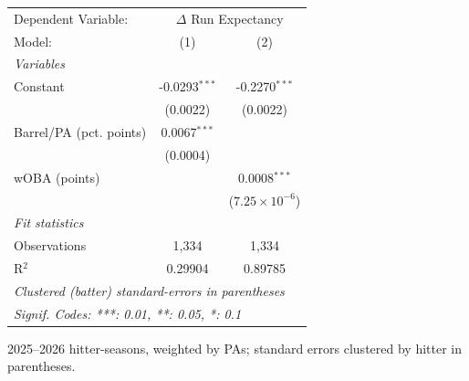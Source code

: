 
\begingroup
\centering
\begin{tabular}{lcc}
   \tabularnewline \midrule \midrule
   Dependent Variable: & \multicolumn{2}{c}{$\Delta$ Run Expectancy}\\
   Model:                  & (1)             & (2)\\  
   \midrule
   \emph{Variables}\\
   Constant                & -0.0293$^{***}$ & -0.2270$^{***}$\\   
                           & (0.0022)        & (0.0022)\\   
   Barrel/PA (pct. points) & 0.0067$^{***}$  &   \\   
                           & (0.0004)        &   \\   
   wOBA (points)           &                 & 0.0008$^{***}$\\   
                           &                 & ($7.25\times 10^{-6}$)\\    
   \midrule
   \emph{Fit statistics}\\
   Observations            & 1,334           & 1,334\\  
   R$^2$                   & 0.29904         & 0.89785\\  
   \midrule \midrule
   \multicolumn{3}{l}{\emph{Clustered (batter) standard-errors in parentheses}}\\
   \multicolumn{3}{l}{\emph{Signif. Codes: ***: 0.01, **: 0.05, *: 0.1}}\\
\end{tabular}
 
\par \raggedright 
2025--2026 hitter-seasons, weighted by PAs; standard errors clustered by hitter in parentheses.
\par\endgroup



